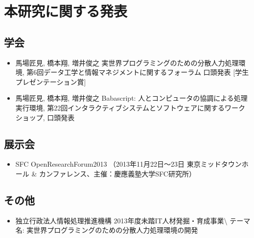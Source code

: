 \chapter*{本研究に関する発表}
\label{chap:publications}

\section*{学会}

\begin{itemize}
\itemsep1pt\parskip0pt
\item
  馬場匠見, 橋本翔, 増井俊之
  実世界プログラミングのための分散人力処理環境,
  第6回データ工学と情報マネジメントに関するフォーラム 口頭発表
  {[}学生プレゼンテーション賞{]}
\item
  馬場匠見, 橋本翔, 増井俊之 Babascript:
  人とコンピュータの協調による処理実行環境,
  第22回インタラクティブシステムとソフトウェアに関するワークショップ,
  口頭発表
\end{itemize}

\section*{展示会}

\begin{itemize}
\itemsep1pt\parskip0pt
\item
  SFC OpenResearchForum2013 （2013年11月22日〜23日
  東京ミッドタウンホール \&
  カンファレンス、主催：慶應義塾大学SFC研究所）
\end{itemize}

\section*{ その他}

\begin{itemize}
\itemsep1pt\parskip0pt
\item
  独立行政法人情報処理推進機構
  2013年度未踏IT人材発掘・育成事業\textbackslash{} テーマ名:
  実世界プログラミングのための分散人力処理環境の開発
\end{itemize}
